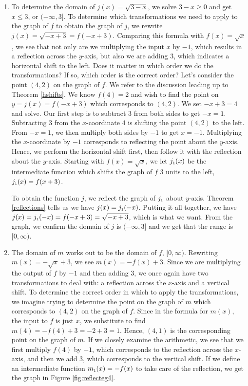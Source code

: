 {\begin{enumerate}
\item  To determine the domain of  $j(x) = \sqrt{3-x}$, we solve $3-x \geq 0$ and get $x \leq 3$, or $(-\infty, 3]$.  To determine which transformations we need to apply to the graph of $f$ to obtain the graph of $j$, we rewrite $j(x) = \sqrt{-x+3} = f(-x+3)$. Comparing this formula with $f(x) = \sqrt{x}$, we see that not only are we multiplying the input $x$ by $-1$, which results in a reflection across the $y$-axis, but also we are adding $3$, which indicates a horizontal shift to the left.  Does it matter in which order we do the transformations?  If so, which order is the correct order?  Let's consider the point $(4,2)$ on the graph of $f$.  We refer to the discussion leading up to Theorem \ref{hshifts}.  We know $f(4) = 2$ and wish to find the point on $y=j(x) = f(-x+3)$ which corresponds to $(4,2)$.  We set $-x+3 = 4$ and solve.  Our first step is to subtract $3$ from both sides to get $-x=1$.  Subtracting $3$ from the $x$-coordinate $4$ is shifting the point $(4,2)$ to the left.   From $-x=1$, we then multiply both sides by $-1$ to get $x=-1$.  Multiplying the $x$-coordinate by $-1$ corresponds to reflecting the point about the $y$-axis.  Hence, we perform the horizontal shift first, then follow it with the reflection about the $y$-axis.  Starting with $f(x) = \sqrt{x}$, we let $j_{\mbox{\tiny$1$}}(x)$ be the intermediate function which shifts the graph of $f$ $3$ units to the left, $j_{\mbox{\tiny$1$}}(x) = f(x+3)$. 

To obtain the function $j$, we reflect the graph of $j_{\mbox{\tiny$1$}}$ about $y$-axis.   Theorem \ref{reflections} tells us we have $j(x) = j_{\mbox{\tiny$1$}}(-x)$. Putting it all together, we have $j(x) = j_{\mbox{\tiny$1$}}(-x) = f(-x+3) = \sqrt{-x+3}$, which is what we want. From the graph, we confirm the domain of $j$ is $(-\infty, 3]$ and we get that the range is $[0, \infty)$.



\item  The domain of $m$ works out to be the domain of $f$, $[0, \infty)$.  Rewriting $m(x) = -\sqrt{x} + 3$, we see $m(x) = -f(x) + 3$.  Since we are multiplying the output of $f$ by $-1$ and then adding $3$, we once again have two transformations to deal with:  a reflection across the $x$-axis and a vertical shift.  To determine the correct order in which to apply the transformations, we imagine trying to determine the point on the graph of $m$ which corresponds to $(4,2)$ on the graph of $f$.  Since in the formula for $m(x)$, the input to $f$ is just $x$, we substitute to find  $m(4) = -f(4)+3 = -2+3=1$.  Hence, $(4,1)$ is the corresponding point on the graph of $m$. If we closely examine the arithmetic, we see that we first multiply $f(4)$ by $-1$, which corresponds to the reflection across the $x$-axis, and then we add $3$, which corresponds to the vertical shift.  If we define an intermediate function $m_{\mbox{\tiny$1$}}(x) = -f(x)$ to take care of the reflection, we get the graph in Figure \ref{fig:reflecteg4}.


\end{enumerate}}
